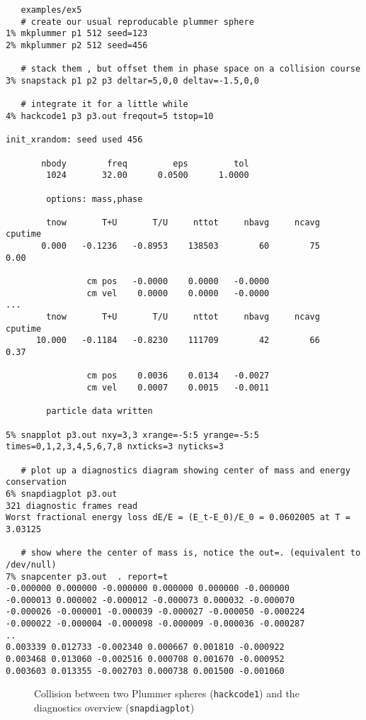 \footnotesize\begin{verbatim}
   examples/ex5
   # create our usual reproducable plummer sphere
1% mkplummer p1 512 seed=123
2% mkplummer p2 512 seed=456

   # stack them , but offset them in phase space on a collision course
3% snapstack p1 p2 p3 deltar=5,0,0 deltav=-1.5,0,0 

   # integrate it for a little while
4% hackcode1 p3 p3.out freqout=5 tstop=10
 
init_xrandom: seed used 456
 
       nbody        freq         eps         tol
        1024       32.00      0.0500      1.0000
 
        options: mass,phase
 
        tnow       T+U       T/U     nttot     nbavg     ncavg   cputime
       0.000   -0.1236   -0.8953    138503        60        75      0.00
 
                cm pos   -0.0000    0.0000   -0.0000
                cm vel    0.0000    0.0000   -0.0000
...
        tnow       T+U       T/U     nttot     nbavg     ncavg   cputime
      10.000   -0.1184   -0.8230    111709        42        66      0.37
 
                cm pos    0.0036    0.0134   -0.0027
                cm vel    0.0007    0.0015   -0.0011
 
        particle data written

5% snapplot p3.out nxy=3,3 xrange=-5:5 yrange=-5:5 times=0,1,2,3,4,5,6,7,8 nxticks=3 nyticks=3

   # plot up a diagnostics diagram showing center of mass and energy conservation
6% snapdiagplot p3.out
321 diagnostic frames read
Worst fractional energy loss dE/E = (E_t-E_0)/E_0 = 0.0602005 at T = 3.03125

   # show where the center of mass is, notice the out=. (equivalent to /dev/null)
7% snapcenter p3.out  . report=t
-0.000000 0.000000 -0.000000 0.000000 0.000000 -0.000000
-0.000013 0.000002 -0.000012 -0.000073 0.000032 -0.000070
-0.000026 -0.000001 -0.000039 -0.000027 -0.000050 -0.000224
-0.000022 -0.000004 -0.000098 -0.000009 -0.000036 -0.000287
..
0.003339 0.012733 -0.002340 0.000667 0.001810 -0.000922
0.003468 0.013060 -0.002516 0.000708 0.001670 -0.000952
0.003603 0.013355 -0.002703 0.000738 0.001500 -0.001060

\end{verbatim}\normalsize

\begin{figure}[h!]
\caption[Collision between two Plummer spheres]
{Collision between two Plummer spheres ({\tt hackcode1}) 
and the diagnostics overview ({\tt snapdiagplot})
}
\label{f:coll}
\end{figure}


